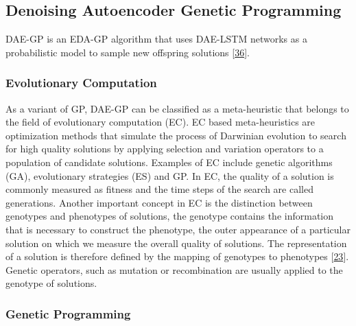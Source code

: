 \documentclass[
  11pt,
]{article}
\begin{document}
\hypertarget{denoising-autoencoder-genetic-programming}{%
\subsection{Denoising Autoencoder Genetic Programming}\label{denoising-autoencoder-genetic-programming}}

DAE-GP is an EDA-GP algorithm that uses DAE-LSTM networks as a probabilistic model to sample new offspring solutions {[}\protect\hyperlink{ref-dae-gp_2020_rtree}{36}{]}.

\hypertarget{evolutionary-computation}{%
\subsubsection{Evolutionary Computation}\label{evolutionary-computation}}

As a variant of GP, DAE-GP can be classified as a meta-heuristic that belongs to the field of evolutionary computation (EC).
EC based meta-heuristics are optimization methods that simulate the process of Darwinian evolution to search for high quality solutions by applying selection and variation operators to a population of candidate solutions.
Examples of EC include genetic algorithms (GA), evolutionary strategies (ES) and GP.
In EC, the quality of a solution is commonly measured as fitness and the time steps of the search are called generations.
Another important concept in EC is the distinction between genotypes and phenotypes of solutions, the genotype contains the information that is necessary to construct the phenotype, the outer appearance of a particular solution on which we measure the overall quality of solutions.
The representation of a solution is therefore defined by the mapping of genotypes to phenotypes {[}\protect\hyperlink{ref-design_of_modern_heuristics}{23}{]}.
Genetic operators, such as mutation or recombination are usually applied to the genotype of solutions.

\hypertarget{genetic-programming}{%
\subsubsection{Genetic Programming}\label{genetic-programming}}
\end{document}
